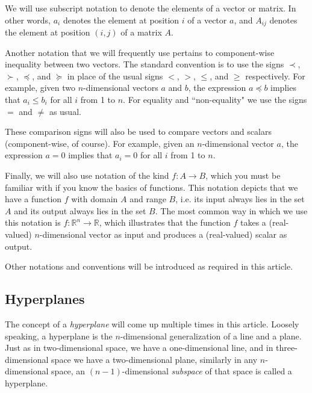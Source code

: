\documentclass[a4paper]{article}
\theoremstyle{definition}
\begin{document}
We will use subscript notation to denote the elements of a vector or matrix.
In other words, $a_i$ denotes the element at position $i$ of a vector $a$, and $A_{ij}$ denotes the element at position $(i, j)$ of a matrix $A$.

Another notation that we will frequently use pertains to component-wise inequality between two vectors.
The standard convention is to use the signs $\prec$, $\succ$, $\preceq$, and $\succeq$ in place of the usual signs $<$, $>$, $\leq$, and $\geq$ respectively.
For example, given two $n$-dimensional vectors $a$ and $b$, the expression $a \preceq b$ implies that $a_i \leq b_i$ for all $i$ from 1 to $n$.
For equality and ``non-equality" we use the signs $=$ and $\neq$ as usual.

These comparison signs will also be used to compare vectors and scalars (component-wise, of course).
For example, given an $n$-dimensional vector $a$, the expression $a = 0$ implies that $a_i = 0$ for all $i$ from 1 to $n$.

Finally, we will also use notation of the kind $f : A \rightarrow B$, which you must be familiar with if you know the basics of functions.
This notation depicts that we have a function $f$ with domain $A$ and range $B$, i.e. its input always lies in the set $A$ and its output always lies in the set $B$.
The most common way in which we use this notation is $f : \mathbb{R}^n \rightarrow \mathbb{R}$, which illustrates that the function $f$ takes a (real-valued) $n$-dimensional vector as input and produces a (real-valued) scalar as output.

Other notations and conventions will be introduced as required in this article.

\subsection{Hyperplanes}

The concept of a \textit{hyperplane} will come up multiple times in this article.
Loosely speaking, a hyperplane is the $n$-dimensional generalization of a line and a plane.
Just as in two-dimensional space, we have a one-dimensional line, and in three-dimensional space we have a two-dimensional plane, similarly in any $n$-dimensional space, an $(n{-}1)$-dimensional \textit{subspace} of that space is called a hyperplane.
\end{document}
